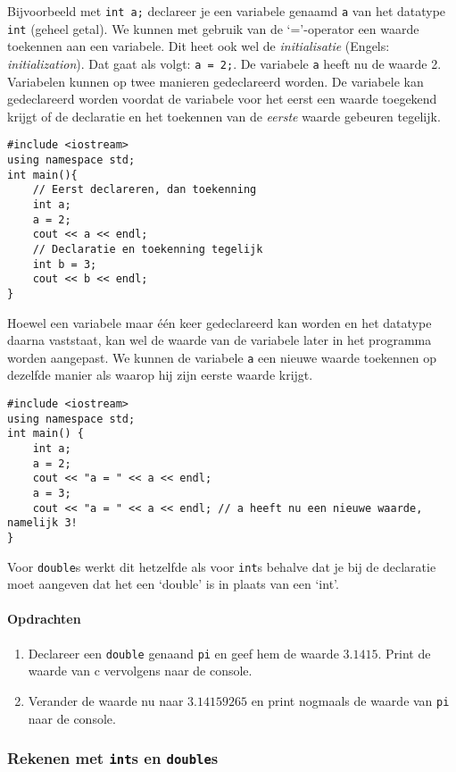 \documentclass[12pt,a4paper]{article}
\newcommand{\icode}{\lstinline}
\begin{document}
Bijvoorbeeld met \icode{int a;} declareer je een variabele genaamd \icode{a} van het datatype 
\icode{int} (geheel getal). We kunnen met gebruik van de `='-operator een waarde toekennen aan 
een variabele. Dit heet ook wel de \emph{initialisatie} (Engels: \emph{initialization}).
Dat gaat als volgt: \icode{a = 2;}. De variabele \icode{a} heeft nu de waarde 2.
Variabelen kunnen op twee manieren gedeclareerd worden. De variabele kan gedeclareerd worden 
voordat de variabele voor het eerst een waarde toegekend krijgt of de declaratie en het toekennen 
van de \emph{eerste} waarde gebeuren tegelijk. 
\begin{lstlisting}
#include <iostream> 
using namespace std; 
int main(){
	// Eerst declareren, dan toekenning 
	int a; 
	a = 2; 
	cout << a << endl; 
	// Declaratie en toekenning tegelijk
	int b = 3; 
	cout << b << endl; 
}
\end{lstlisting}
Hoewel een variabele maar één keer gedeclareerd kan worden en het datatype daarna vaststaat, kan 
wel de waarde van de variabele later in het programma worden aangepast. We kunnen de variabele 
\icode{a} een nieuwe waarde toekennen op dezelfde manier als waarop hij zijn eerste waarde krijgt. 
\begin{lstlisting}
#include <iostream> 
using namespace std;
int main() {
	int a; 
	a = 2; 
	cout << "a = " << a << endl; 
	a = 3; 
	cout << "a = " << a << endl; // a heeft nu een nieuwe waarde, namelijk 3! 
}
\end{lstlisting}
Voor \icode{double}s werkt dit hetzelfde als voor \icode{int}s behalve dat je bij de declaratie moet 
aangeven dat het een ‘double’ is in plaats van een ‘int’. 
\paragraph{Opdrachten}
\begin{enumerate} 
\item 
	Declareer een \icode{double} genaand \icode{pi} en geef hem de waarde $3.1415$. 
Print de waarde van c vervolgens naar de console. 
\item 
	Verander de waarde nu naar $3.14159265$ en print
nogmaals de waarde van \icode{pi} naar de console. 
\end{enumerate} 

\subsubsection{Rekenen met \icode{int}s en \icode{double}s}
\end{document}
